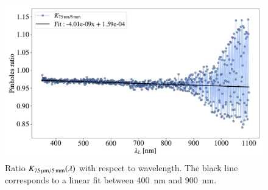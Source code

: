 

\begin{figure}[h]
    \centering
    \includegraphics[width=\columnwidth]{fig/ratio_pinholes.pdf}
    \caption{Ratio $K_\mathrm{\SI{75}{\micro\meter}/\SI{5}{\milli\meter}}(\lambda)$ with respect to wavelength. The black line corresponds to a linear fit between \SI{400}{\nm} and \SI{900}{\nm}.}
    \label{fig:ratio_pinholes}
\end{figure}

%
%
%
%

